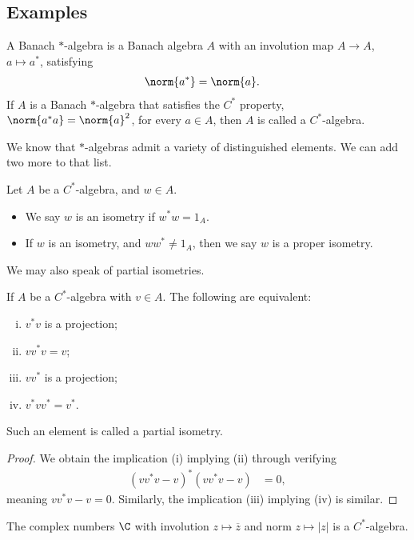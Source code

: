 \documentclass[10pt]{mypackage}
\begin{document}
\subsection{Examples}%
\begin{definition}
  A Banach $\ast$-algebra is a Banach algebra $A$ with an involution map $A\rightarrow A$, $a\mapsto a^{\ast}$, satisfying
  \begin{align*}
    \norm{a^{\ast}} &= \norm{a}.
  \end{align*}
  If $A$ is a Banach $\ast$-algebra that satisfies the $C^{\ast}$ property, $\norm{a^{\ast}a} = \norm{a}^2$, for every $a\in A$, then $A$ is called a $C^{\ast}$-algebra.
\end{definition}
We know that $\ast$-algebras admit a variety of distinguished elements. We can add two more to that list.
\begin{definition}
  Let $A$ be a $C^{\ast}$-algebra, and $w\in A$.
  \begin{itemize}
    \item We say $w$ is an isometry if $w^{\ast}w = 1_A$.
    \item If $w$ is an isometry, and $ww^{\ast} \neq 1_A$, then we say $w$ is a proper isometry.
  \end{itemize}
\end{definition}
We may also speak of partial isometries.
\begin{lemma}
  If $A$ be a $C^{\ast}$-algebra with $v\in A$. The following are equivalent:
  \begin{enumerate}[(i)]
    \item $v^{\ast}v$ is a projection;
    \item $vv^{\ast}v = v$;
    \item $vv^{\ast}$ is a projection;
    \item $v^{\ast}vv^{\ast} = v^{\ast}$.
  \end{enumerate}
  Such an element is called a partial isometry.
\end{lemma}
\begin{proof}
  We obtain the implication (i) implying (ii) through verifying
  \begin{align*}
    \left(vv^{\ast}v - v\right)^{\ast}\left(vv^{\ast}v - v\right) &= 0,
  \end{align*}
  meaning $vv^{\ast}v - v = 0$. Similarly, the implication (iii) implying (iv) is similar.
\end{proof}
\begin{example}
  The complex numbers $\C$ with involution $z\mapsto \overline{z}$ and norm $z\mapsto \left\vert z \right\vert$ is a $C^{\ast}$-algebra.
\end{example}
\end{document}
